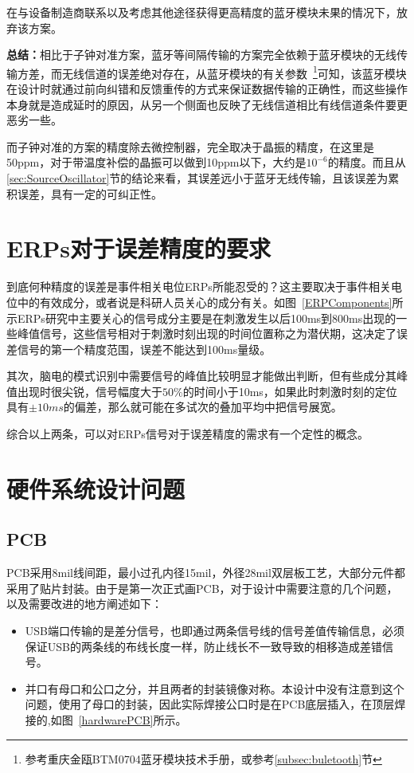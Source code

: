 在与设备制造商联系以及考虑其他途径获得更高精度的蓝牙模块未果的情况下，放弃该方案。

\textbf{总结：}相比于子钟对准方案，蓝牙等间隔传输的方案完全依赖于蓝牙模块的无线传输方差，而无线信道的误差绝对存在，从蓝牙模块的有关参数~\footnote{参考重庆金瓯BTM0704蓝牙模块技术手册，或参考\ref{subsec:buletooth}节}可知，该蓝牙模块在设计时就通过前向纠错和反馈重传的方式来保证数据传输的正确性，而这些操作本身就是造成延时的原因，从另一个侧面也反映了无线信道相比有线信道条件要更恶劣一些。

而子钟对准的方案的精度除去微控制器，完全取决于晶振的精度，在这里是50ppm，对于带温度补偿的晶振可以做到10ppm以下，大约是$10^{-6}$的精度。而且从\ref{sec:SourceOscillator}节的结论来看，其误差远小于蓝牙无线传输，且该误差为累积误差，具有一定的可纠正性。

\section{ERPs对于误差精度的要求}

到底何种精度的误差是事件相关电位ERPs所能忍受的？这主要取决于事件相关电位中的有效成分，或者说是科研人员关心的成分有关。如图~\ref{ERPComponents}所示ERPs研究中主要关心的信号成分主要是在刺激发生以后100ms到800ms出现的一些峰值信号，这些信号相对于刺激时刻出现的时间位置称之为潜伏期，这决定了误差信号的第一个精度范围，误差不能达到100ms量级。

其次，脑电的模式识别中需要信号的峰值比较明显才能做出判断，但有些成分其峰值出现时很尖锐，信号幅度大于$50 \%$的时间小于10ms，如果此时刺激时刻的定位具有$\pm 10ms$的偏差，那么就可能在多试次的叠加平均中把信号展宽。

综合以上两条，可以对ERPs信号对于误差精度的需求有一个定性的概念。

\section{硬件系统设计问题}

\subsection{PCB}
	PCB采用8mil线间距，最小过孔内径15mil，外径28mil双层板工艺，大部分元件都采用了贴片封装。由于是第一次正式画PCB，对于设计中需要注意的几个问题，以及需要改进的地方阐述如下：
\begin{itemize}
\item	USB端口传输的是差分信号，也即通过两条信号线的信号差值传输信息，必须保证USB的两条线的布线长度一样，防止线长不一致导致的相移造成差错信号。
\item	并口有母口和公口之分，并且两者的封装镜像对称。本设计中没有注意到这个问题，使用了母口的封装，因此实际焊接公口时是在PCB底层插入，在顶层焊接的,如图~\ref{hardwarePCB}所示。
\end{itemize}

